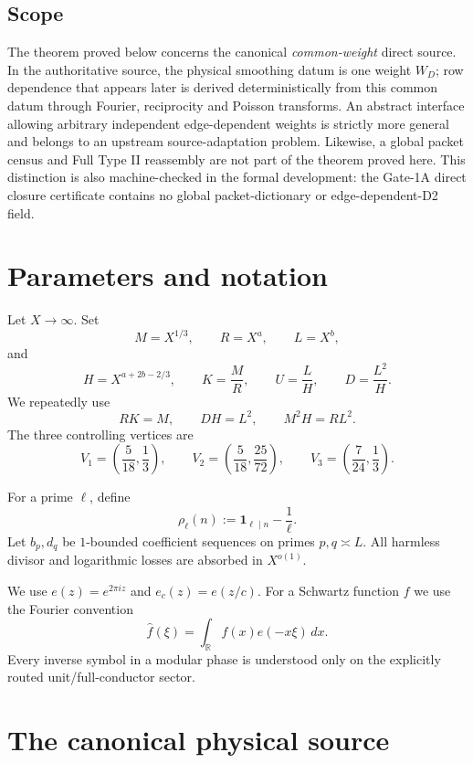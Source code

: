 \documentclass[11pt]{article}
\theoremstyle{definition}
\newcommand{\1}{\mathbf 1}
\begin{document}
\subsection{Scope}
The theorem proved below concerns the canonical \emph{common-weight} direct
source.  In the authoritative source, the physical smoothing datum is one
weight $W_D$; row dependence that appears later is derived deterministically
from this common datum through Fourier, reciprocity and Poisson transforms.
An abstract interface allowing arbitrary independent edge-dependent weights
is strictly more general and belongs to an upstream source-adaptation problem.
Likewise, a global packet census and Full Type II reassembly are not part of
the theorem proved here.  This distinction is also machine-checked in the
formal development: the Gate-1A direct closure certificate contains no global
packet-dictionary or edge-dependent-D2 field.

\section{Parameters and notation}
Let $X\to\infty$. Set
\[
    M=X^{1/3},\qquad R=X^a,\qquad L=X^b,
\]
and
\[
    H=X^{a+2b-2/3},\qquad
    K=\frac{M}{R},\qquad
    U=\frac{L}{H},\qquad
    D=\frac{L^2}{H}.
\]
We repeatedly use
\begin{equation}
    RK=M,\qquad DH=L^2,\qquad M^2H=RL^2.
    \label{eq:scale-identities}
\end{equation}
The three controlling vertices are
\[
   V_1=\left(\frac{5}{18},\frac13\right),\qquad
   V_2=\left(\frac{5}{18},\frac{25}{72}\right),\qquad
   V_3=\left(\frac{7}{24},\frac13\right).
\]

For a prime $\ell$, define
\begin{equation}
   \rho_\ell(n):=\1_{\ell\mid n}-\frac1\ell.
   \label{eq:rho-def}
\end{equation}
Let $b_p,d_q$ be $1$-bounded coefficient sequences on primes $p,q\asymp L$.
All harmless divisor and logarithmic losses are absorbed in $X^{o(1)}$.

We use $e(z)=e^{2\pi iz}$ and $e_c(z)=e(z/c)$.  For a Schwartz function
$f$ we use the Fourier convention
\[
   \widehat f(\xi)=\int_{\mathbb R} f(x)e(-x\xi)\,dx.
\]
Every inverse symbol in a modular phase is understood only on the explicitly
routed unit/full-conductor sector.

\section{The canonical physical source}
\end{document}
